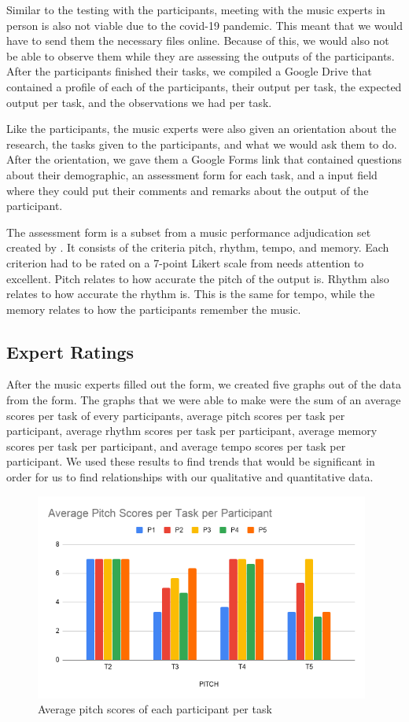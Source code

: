 Similar to the testing with the participants, meeting with the music experts in person is also not viable due to the covid-19 pandemic. This meant that we would have to send them the necessary files online. Because of this, we would also not be able to observe them while they are assessing the outputs of the participants. After the participants finished their tasks, we compiled a Google Drive that contained a profile of each of the participants, their output per task, the expected output per task, and the observations we had per task.

Like the participants, the music experts were also given an orientation about the research, the tasks given to the participants, and what we would ask them to do. After the orientation, we gave them a Google Forms link that contained questions about their demographic, an assessment form for each task, and a input field where they could put their comments and remarks about the output of the participant.

The assessment form is a subset from a music performance adjudication set created by . It consists of the criteria pitch, rhythm, tempo, and memory. Each criterion had to be rated on a 7-point Likert scale from needs attention to excellent. Pitch relates to how accurate the pitch of the output is. Rhythm also relates to how accurate the rhythm is. This is the same for tempo, while the memory relates to how the participants remember the music.

\subsection{Expert Ratings}
After the music experts filled out the form, we created five graphs out of the data from the form. The graphs that we were able to make were the sum of an average scores per task of every participants, average pitch scores per task per participant, average rhythm scores per task per participant, average memory scores per task per participant, and average tempo scores per task per participant. We used these results to find trends that would be significant in order for us to find relationships with our qualitative and quantitative data.

\begin{figure}[H]
    \centering
    \includegraphics[width=11cm]{figures/Results/AveragePitch.png}
    \caption{Average pitch scores of each participant per task}
    \label{fig:AveragePitch}
\end{figure}

